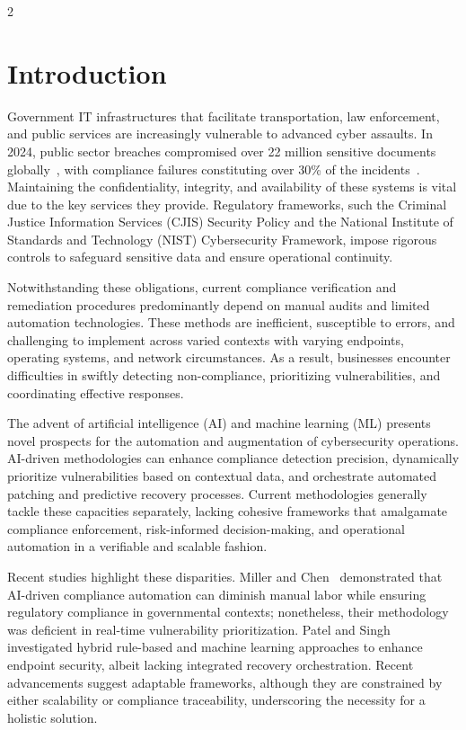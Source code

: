 \documentclass[10pt]{article} %
\begin{document}
\begin{multicols}{2}

 \section{Introduction}

Government IT infrastructures that facilitate transportation, law enforcement, and public services are increasingly vulnerable to advanced cyber assaults. In 2024, public sector breaches compromised over 22 million sensitive documents globally~\cite{cyberstats2024}, with compliance failures constituting over 30\% of the incidents~\cite{nist_csf}. Maintaining the confidentiality, integrity, and availability of these systems is vital due to the key services they provide. Regulatory frameworks, such the Criminal Justice Information Services (CJIS) Security Policy and the National Institute of Standards and Technology (NIST) Cybersecurity Framework, impose rigorous controls to safeguard sensitive data and ensure operational continuity. 

Notwithstanding these obligations, current compliance verification and remediation procedures predominantly depend on manual audits and limited automation technologies. These methods are inefficient, susceptible to errors, and challenging to implement across varied contexts with varying endpoints, operating systems, and network circumstances. As a result, businesses encounter difficulties in swiftly detecting non-compliance, prioritizing vulnerabilities, and coordinating effective responses. 

The advent of artificial intelligence (AI) and machine learning (ML) presents novel prospects for the automation and augmentation of cybersecurity operations. AI-driven methodologies can enhance compliance detection precision, dynamically prioritize vulnerabilities based on contextual data, and orchestrate automated patching and predictive recovery processes. Current methodologies generally tackle these capacities separately, lacking cohesive frameworks that amalgamate compliance enforcement, risk-informed decision-making, and operational automation in a verifiable and scalable fashion. 

Recent studies highlight these disparities. Miller and Chen~\cite{miller2022ai} demonstrated that AI-driven compliance automation can diminish manual labor while ensuring regulatory compliance in governmental contexts; nonetheless, their methodology was deficient in real-time vulnerability prioritization. Patel and Singh~\cite{patel2023endpoints} investigated hybrid rule-based and machine learning approaches to enhance endpoint security, albeit lacking integrated recovery orchestration. Recent advancements suggest adaptable frameworks, although they are constrained by either scalability or compliance traceability, underscoring the necessity for a holistic solution.


\end{multicols}
\end{document}
